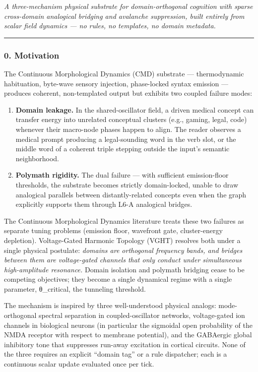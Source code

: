 \documentclass[
  11pt,
  a4paper,
]{article}
\providecommand{\tightlist}{%
  \setlength{\itemsep}{0pt}\setlength{\parskip}{0pt}}
\begin{document}
\emph{A three-mechanism physical substrate for domain-orthogonal
cognition with sparse cross-domain analogical bridging and avalanche
suppression, built entirely from scalar field dynamics --- no rules, no
templates, no domain metadata.}

\begin{center}\rule{0.5\linewidth}{0.5pt}\end{center}

\subsubsection{0. Motivation}\label{motivation}

The Continuous Morphological Dynamics (CMD) substrate --- thermodynamic
habituation, byte-wave sensory injection, phase-locked syntax emission
--- produces coherent, non-templated output but exhibits two coupled
failure modes:

\begin{enumerate}
\def\labelenumi{\arabic{enumi}.}
\tightlist
\item
  \textbf{Domain leakage.} In the shared-oscillator field, a driven
  medical concept can transfer energy into unrelated conceptual clusters
  (e.g., gaming, legal, code) whenever their macro-node phases happen to
  align. The reader observes a medical prompt producing a legal-sounding
  word in the verb slot, or the middle word of a coherent triple
  stepping outside the input's semantic neighborhood.
\item
  \textbf{Polymath rigidity.} The dual failure --- with sufficient
  emission-floor thresholds, the substrate becomes strictly
  domain-locked, unable to draw analogical parallels between
  distantly-related concepts even when the graph explicitly supports
  them through L6-A analogical bridges.
\end{enumerate}

The Continuous Morphological Dynamics literature treats these two
failures as separate tuning problems (emission floor, wavefront gate,
cluster-energy depletion). Voltage-Gated Harmonic Topology (VGHT)
resolves both under a single physical postulate: \emph{domains are
orthogonal frequency bands, and bridges between them are voltage-gated
channels that only conduct under simultaneous high-amplitude resonance.}
Domain isolation and polymath bridging cease to be competing objectives;
they become a single dynamical regime with a single parameter,
θ\_critical, the tunneling threshold.

The mechanism is inspired by three well-understood physical analogs:
mode-orthogonal spectral separation in coupled-oscillator networks,
voltage-gated ion channels in biological neurons (in particular the
sigmoidal open probability of the NMDA receptor with respect to membrane
potential), and the GABAergic global inhibitory tone that suppresses
run-away excitation in cortical circuits. None of the three requires an
explicit ``domain tag'' or a rule dispatcher; each is a continuous
scalar update evaluated once per tick.
\end{document}
